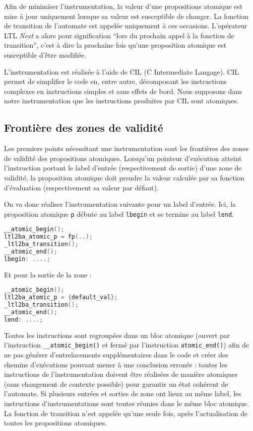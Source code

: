 Afin de minimiser l'instrumentation, la valeur d'une propositions
atomique est mise à jour uniquement lorsque sa valeur est susceptible de
changer. La fonction de transition de l'automate est appelée uniquement
à ces occasions. L'opérateur LTL \emph{Next} a alors pour signification
``lors du prochain appel à la fonction de transition'', c'est à dire la
prochaine fois qu'une proposition atomique est susceptible d'être
modifiée.

L'instrumentation est réalisée à l'aide de CIL (C Intermediate Langage).
CIL permet de simplifier le code en, entre autre, décomposant les
instructions complexes en instructions simples et sans effets de bord.
Nous supposons dans notre instrumentation que les instructions produites
par CIL sont atomiques.

\subsection{Frontière des zones de validité}

Les premiers points nécessitant une instrumentation sont les frontières
des zones de validité des propositions atomiques. Lorsqu'un pointeur
d'exécution atteint l'instruction portant le label d'entrée
(respectivement de sortie) d'une zone de validité, la proposition
atomique doit prendre la valeur calculée par sa fonction d'évaluation
(respectivement sa valeur par défaut).

On va donc réaliser l'instrumentation suivante pour un label d'entrée.
Ici, la proposition atomique \texttt{p} débute au label
\texttt{lbegin} et se termine au label \texttt{lend}.

\begin{lstlisting}[language=C]
__atomic_begin();
ltl2ba_atomic_p = fp(..);
_ltl2ba_transition();
__atomic_end();
lbegin: ....;
\end{lstlisting}

Et pour la sortie de la zone :

\begin{lstlisting}[language=C]
__atomic_begin();
ltl2ba_atomic_p = {default_val};
_ltl2ba_transition();
__atomic_end();
lend: ....;
\end{lstlisting}

Toutes les instructions sont regroupées dans un bloc atomique (ouvert
par l'instruction \texttt{\_\_atomic\_begin()} et fermé par
l'instruction \texttt{atomic\_end()}) afin de ne pas générer
d'entrelacements supplémentaires dans le code et créer des chemins
d'exécutions pouvant mener à une conclusion erronée : toutes les
instructions de l'instrumentation doivent être réalisées de manière
atomiques (sans changement de contexte possible) pour garantir un état
cohérent de l'automate. Si plusieurs entrées et sorties de zone ont
lieux au même label, les instructions d'instrumentations sont toutes
réunies dans le même bloc atomique. La fonction de transition n'est
appelée qu'une seule fois, après l'actualisation de toutes les
propositions atomiques.

